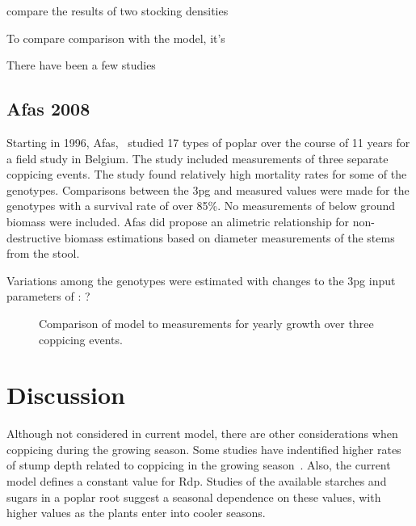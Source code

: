 \documentclass[10pt]{article}
\begin{document}
\cite{Proe2002} compare the results of two stocking densities

To compare comparison with the
model, it's 

There have been a few studies

\subsection*{Afas 2008}
\label{afas2008}

Starting in 1996, Afas,~\cite{Afas2008a} studied 17 types of poplar
over the course of 11 years for a field study in Belgium.  The study
included measurements of three separate coppicing events.  The study
found relatively high mortality rates for some of the genotypes.
Comparisons between the \ac{3pg} and measured values were made for the
genotypes with a survival rate of over 85\%.  No measurements of below
ground biomass were included.  Afas did propose an alimetric
relationship for non-destructive biomass estimations based on diameter
measurements of the stems from the stool.

Variations among the genotypes were estimated with changes to the \ac{3pg}
input parameters of : ?

\begin{table}[!ht]
  \centering
    
  \caption{\ac{3pg} parameter variations of \ac{3pg} among genotypes}
  \label{tab:afas-3pg}
\end{table}

\begin{figure}[!ht]
  \centering
  
  \caption{Comparison of model to measurements for yearly growth over three
    coppicing events.}
\label{fig:afas-biomass}
\end{figure}

\section*{Discussion}

Although not considered in current model, there are other
considerations when coppicing during the growing season.  Some studies
have indentified higher rates of stump depth related to coppicing in
the growing season~\cite{}.  Also, the current model defines a
constant value for \ac{Rdp}.  Studies of the available starches and
sugars in a poplar root suggest a seasonal dependence on these values,
with higher values as the plants enter into cooler
seasons\cite{Regier2010}.
\end{document}
